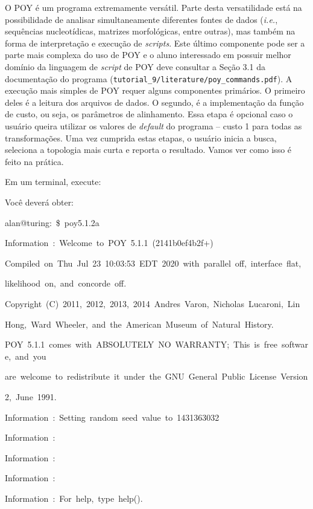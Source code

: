 \begin{refsection}
O POY é um programa extremamente versátil. Parte desta versatilidade está na possibilidade de analisar simultaneamente diferentes fontes de dados (\textit{i.e.}, sequências nucleotídicas, matrizes morfológicas, entre outras), mas também na forma de interpretação e execução de \textit{scripts}. Este último componente pode ser a parte mais complexa do uso de POY e o aluno interessado em possuir melhor domínio da linguagem de \textit{script} de POY deve consultar a Seção 3.1 da documentação do programa (\texttt{tutorial\_9/literature/poy\_commands.pdf}). A execução mais simples de POY requer alguns componentes primários. O primeiro deles é a leitura dos arquivos de dados. O segundo, é a implementação da função de custo, ou seja, os parâmetros de alinhamento. Essa etapa é opcional caso o usuário queira utilizar os valores de \textit{default} do programa -- custo 1 para todas as transformações. Uma vez cumprida estas etapas, o usuário inicia a busca, seleciona a topologia mais curta e reporta o resultado. Vamos ver como isso é feito na prática.

	Em um terminal, execute:


Você deverá obter:


\scriptsize

alan@turing:{~}\$~poy5.1.2a


Information~:~Welcome~to~POY~5.1.1~(2141b0ef4b2f+)

Compiled~on~Thu~Jul~23~10:03:53~EDT~2020~with~parallel~off,~interface~flat,

likelihood~on,~and~concorde~off.

Copyright~(C)~2011,~2012,~2013,~2014~Andres~Varon,~Nicholas~Lucaroni,~Lin

Hong,~Ward~Wheeler,~and~the~American~Museum~of~Natural~History.

POY~5.1.1~comes~with~ABSOLUTELY~NO~WARRANTY;~This~is~free~software,~and~you

are~welcome~to~redistribute~it~under~the~GNU~General~Public~License~Version

2,~June~1991.

\vspace{20pt}

Information~:~Setting~random~seed~value~to~1431363032

Information~:~

Information~:~

Information~:~

Information~:~For~help,~type~help().


\end{refsection}
